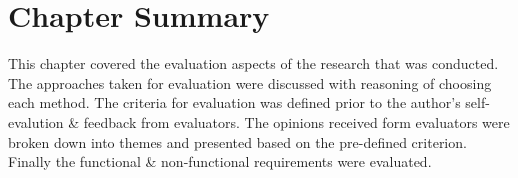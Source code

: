 \section{Chapter Summary}
This chapter covered the evaluation aspects of the research that was conducted. The approaches taken for evaluation were discussed with reasoning of choosing each method. The criteria for evaluation was defined prior to the author's self-evalution \& feedback from evaluators. The opinions received form evaluators were broken down into themes and presented based on the pre-defined criterion. Finally the functional \& non-functional requirements were evaluated.